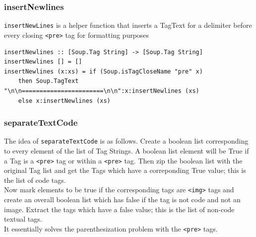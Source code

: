 \documentclass{scrreprt}
\newcommand{\ttt}[1]{\texttt{#1}}
\begin{document}
\subsubsection{insertNewlines}
\texttt{insertNewLines} is a helper function that inserts a TagText for a delimiter before every closing \texttt{<pre>} tag for formatting purposes 

\begin{verbatim}
insertNewlines :: [Soup.Tag String] -> [Soup.Tag String]
insertNewlines [] = []
insertNewlines (x:xs) = if (Soup.isTagCloseName "pre" x)
    then Soup.TagText "\n\n=======================\n\n":x:insertNewlines (xs)
    else x:insertNewlines (xs)
\end{verbatim}


\subsubsection{separateTextCode}
The idea of \texttt{separateTextCode} is as follows. Create a boolean list corresponding to every element of the list of Tag Strings. A boolean list element will be True if a Tag is a \texttt{<pre>} tag or within a \texttt{<pre>} tag. Then zip the boolean list with the original Tag list and get the Tags which have a correponding True value; this is the list of code tags. \\ Now mark elements to be true if the corresponding tags are \texttt{<img>} tags and create an overall boolean list which has false if the tag is not code and not an image. Extract the tags which have a false value; this is the list of non-code textual tags. \\ It essentially solves the parenthesization problem with the \ttt{<pre>} tags.
\end{document}
